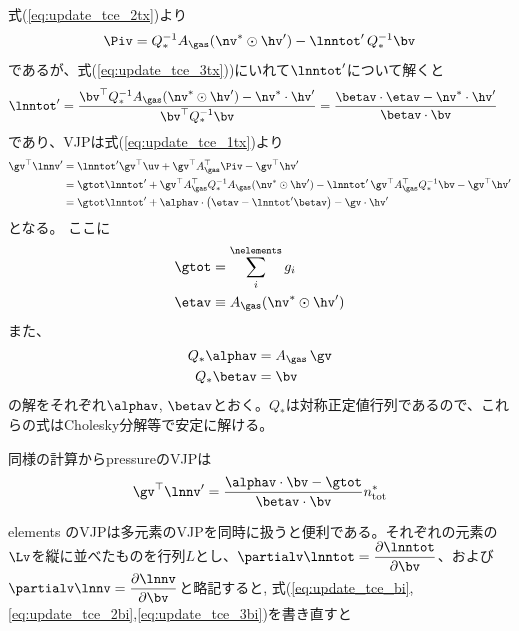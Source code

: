 式(\ref{eq:update_tce_2tx})より
\begin{align}
\label{eq:update_tce_2txi}
    \Piv &=  Q_\ast^{-1} A_\gas (\nv^\ast \odot \hv^\prime) - \lnntot^\prime \, Q_\ast^{-1} \bv \\
\end{align}
であるが、式(\ref{eq:update_tce_3tx}))にいれて$\lnntot^\prime $について解くと
\begin{align}
\lnntot^\prime &= \frac{\bv^\top Q_\ast^{-1} A_\gas (\nv^\ast \odot \hv^\prime) - \nv^\ast \cdot \hv^\prime}{\bv^\top Q_\ast^{-1} \bv } = \frac{\betav \cdot \etav - \nv^\ast \cdot \hv^\prime}{\betav \cdot \bv } 
\end{align}
であり、VJPは式(\ref{eq:update_tce_1tx})より
\begin{align}
\gv^\top \lnnv^\prime &=  \lnntot^\prime  \gv^\top \uv + \gv^\top A_\gas^\top \Piv - \gv^\top \hv^\prime \\
&= \gtot \lnntot^\prime  +  \gv^\top A_\gas^\top Q_\ast^{-1} A_\gas (\nv^\ast \odot \hv^\prime) - \lnntot^\prime \, \gv^\top A_\gas^\top Q_\ast^{-1} \bv  - \gv^\top \hv^\prime \\
&= \gtot \lnntot^\prime  +  \alphav \cdot \left( \etav - \lnntot^\prime \betav \right)  - \gv \cdot \hv^\prime 
\end{align}
となる。
ここに
\begin{align}
\gtot &= \sum_i^\nelements g_i  \\
\etav &\equiv A_\gas (\nv^\ast \odot \hv^\prime) 
\end{align}
また、
\begin{align}
    Q_\ast \alphav &= A_\gas \, \gv \\
    Q_\ast \betav &= \bv
\end{align}
の解をそれぞれ$\alphav$, $\betav$とおく。$Q_\ast$は対称正定値行列であるので、これらの式はCholesky分解等で安定に解ける。

同様の計算からpressureのVJPは
\begin{align}
\gv^\top \lnnv^\prime =  \frac{\alphav \cdot \bv - \gtot}{\betav \cdot \bv} n_\mathrm{tot}^\ast
\end{align}

elements のVJPは多元素のVJPを同時に扱うと便利である。それぞれの元素の$\Lv$を縦に並べたものを行列$L$とし、$\partialv \lnntot = \dfrac{\partial \lnntot}{\partial \bv}$、および$\partialv \lnnv = \dfrac{\partial \lnnv}{\partial \bv}$と略記すると, 式(\ref{eq:update_tce_bi},\ref{eq:update_tce_2bi},\ref{eq:update_tce_3bi})を書き直すと

